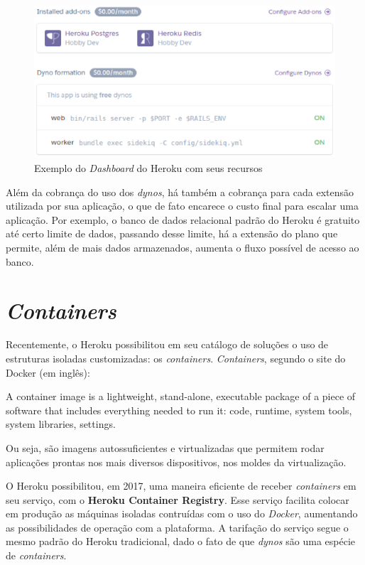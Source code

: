 \begin{figure}[h!]
  \centering
  \includegraphics[scale=0.75]{imagens/heroku_dashboard.eps}
  \caption{Exemplo do \textit{Dashboard} do Heroku com seus recursos}
\end{figure}

Além da cobrança do uso dos \textit{dynos}, há também a cobrança para cada extensão utilizada por sua aplicação, o que de fato encarece o custo final para escalar uma aplicação. Por exemplo, o banco de dados relacional padrão do Heroku é gratuito até certo limite de dados, passando desse limite, há a extensão do plano que permite, além de mais dados armazenados, aumenta o fluxo possível de acesso ao banco.

\section{\textit{Containers}}

Recentemente, o Heroku possibilitou em seu catálogo de soluções o uso de estruturas isoladas customizadas: os \textit{containers}. \textit{Containers}, segundo o site do Docker\cite{dockercontainer} (em inglês):

\begin{citacaoLonga}
  A container image is a lightweight, stand-alone, executable package of a piece of software that includes everything needed to run it: code, runtime, system tools, system libraries, settings.
\end{citacaoLonga}

Ou seja, são imagens autossuficientes e virtualizadas que permitem rodar aplicações prontas nos mais diversos dispositivos, nos moldes da virtualização.

O Heroku possibilitou, em 2017, uma maneira eficiente de receber \textit{containers} em seu serviço, com o \textbf{Heroku Container Registry}\cite{herokucontainerregistry}. Esse serviço facilita colocar em produção as máquinas isoladas contruídas com o uso do \textit{Docker}, aumentando as possibilidades de operação com a plataforma. A tarifação do serviço segue o mesmo padrão do Heroku tradicional, dado o fato de que \textit{dynos} são uma espécie de \textit{containers}.

